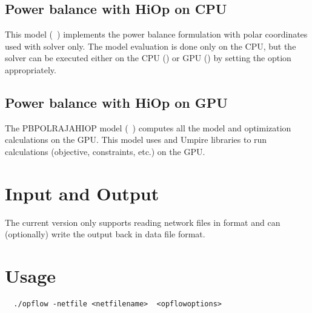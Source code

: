 \begin{comment}
\subsection{Power balance cartesian}
\end{comment}

\subsection{Power balance with HiOp on CPU}
This model ({\opflowmodel~\pbpolhiop}) implements the power balance formulation with polar coordinates used with \hiop solver only. The model evaluation is done only on the CPU, but the \hiop solver can be executed either on the CPU () or GPU () by setting the  option appropriately.

\subsection{Power balance with HiOp on GPU}
The PBPOLRAJAHIOP model ({\opflowmodel~\pbpolrajahiop}) computes all the model and optimization calculations on the GPU. This model uses \raja and Umpire \cite{beckingsale2019umpire} libraries to run \opflow calculations (objective, constraints, etc.) on the GPU. 

\section{Input and Output}
The current \exago version only supports reading network files in \matpower format and can (optionally) write the output back in \matpower data file format.

\section{Usage}
\begin{lstlisting}
  ./opflow -netfile <netfilename>  <opflowoptions>
\end{lstlisting}

